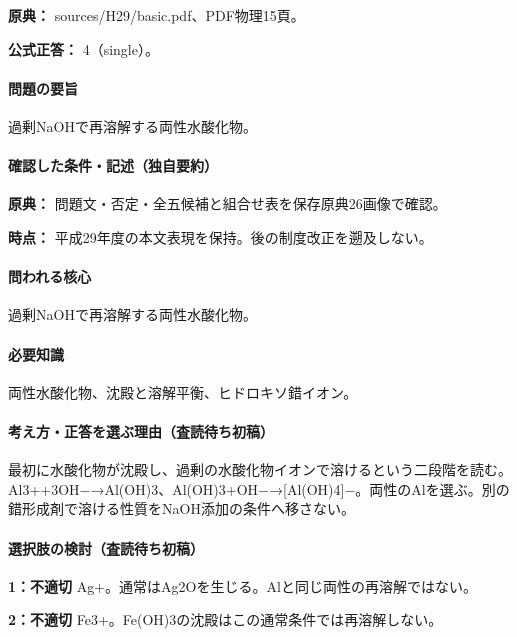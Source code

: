 \noindent\textbf{原典：} sources/H29/basic.pdf、PDF物理15頁。

\textbf{公式正答：} 4（single）。

\paragraph{問題の要旨} 過剰NaOHで再溶解する両性水酸化物。

\paragraph{確認した条件・記述（独自要約）}\mbox{}\par

\noindent\textbf{原典：} 問題文・否定・全五候補と組合せ表を保存原典26画像で確認。\par

\noindent\textbf{時点：} 平成29年度の本文表現を保持。後の制度改正を遡及しない。\par

\paragraph{問われる核心} 過剰NaOHで再溶解する両性水酸化物。

\paragraph{必要知識} 両性水酸化物、沈殿と溶解平衡、ヒドロキソ錯イオン。

\paragraph{考え方・正答を選ぶ理由（査読待ち初稿）} 最初に水酸化物が沈殿し、過剰の水酸化物イオンで溶けるという二段階を読む。Al3++3OH−→Al(OH)3、Al(OH)3+OH−→[Al(OH)4]−。両性のAlを選ぶ。別の錯形成剤で溶ける性質をNaOH添加の条件へ移さない。

\paragraph{選択肢の検討（査読待ち初稿）}\mbox{}\par

\noindent\textbf{1：不適切} Ag+。通常はAg2Oを生じる。Alと同じ両性の再溶解ではない。\par

\noindent\textbf{2：不適切} Fe3+。Fe(OH)3の沈殿はこの通常条件では再溶解しない。\par


